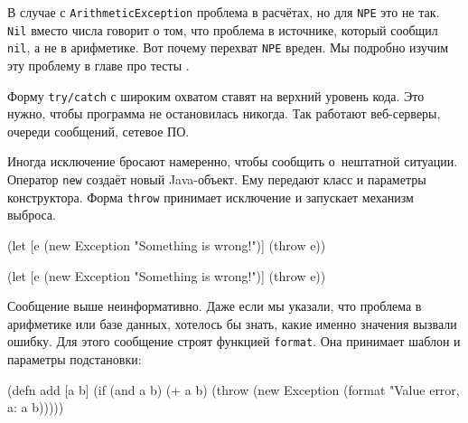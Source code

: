 В случае с \verb|ArithmeticException| проблема в расчётах, но для \verb|NPE|
это не так. \verb|Nil| вместо числа говорит о том, что проблема в источнике,
который сообщил \verb|nil|, а не в арифметике. Вот почему перехват
\verb|NPE| вреден. Мы подробно изучим эту проблему в главе про
тесты .

Форму \verb|try/catch| с широким охватом ставят на верхний уровень кода. Это
нужно, чтобы программа не остановилась никогда. Так работают веб-серверы,
очереди сообщений, сетевое ПО.


Иногда исключение бросают намеренно, чтобы сообщить о~нештатной
ситуации. Оператор \verb|new| создаёт новый Java-объект. Ему передают класс и
параметры конструктора. Форма \verb|throw| принимает исключение и запускает
механизм выброса.

\ifx\devicetype\mobile

\begin{english}
  \begin{clojure}
(let [e (new Exception
          "Something is wrong!")]
  (throw e))
  \end{clojure}
\end{english}

\else

\begin{english}
  \begin{clojure}
(let [e (new Exception "Something is wrong!")]
  (throw e))
  \end{clojure}
\end{english}

\fi

Сообщение выше неинформативно. Даже если мы указали, что проблема в арифметике
или базе данных, хотелось бы знать, какие именно значения вызвали ошибку. Для
этого сообщение строят функцией \verb|format|. Она принимает шаблон и
параметры подстановки:


\ifx\devicetype\mobile

\begin{english}
  \begin{clojure}
(defn add [a b]
  (if (and a b)
    (+ a b)
    (throw
      (new Exception
        (format
          "Value error, a: %
          a b)))))
  \end{clojure}
\end{english}

\else

